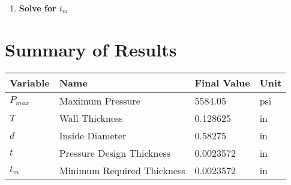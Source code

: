 \documentclass[11pt,a4paper]{article}
\begin{document}
\begin{enumerate}[label=\textbf{Step \arabic*:},leftmargin=2cm]
\item \textbf{Solve for $t_{m}$}


\end{enumerate}


\section{Summary of Results}

\begin{longtable}{llll}
\toprule
Variable & Name & Final Value & Unit \\
\midrule
\endhead
$P_{max}$ & Maximum Pressure & 5584.05 & psi \\
$T$ & Wall Thickness & 0.128625 & in \\
$d$ & Inside Diameter & 0.58275 & in \\
$t$ & Pressure Design Thickness & 0.0023572 & in \\
$t_{m}$ & Minimum Required Thickness & 0.0023572 & in \\
\bottomrule
\end{longtable}
\end{document}

